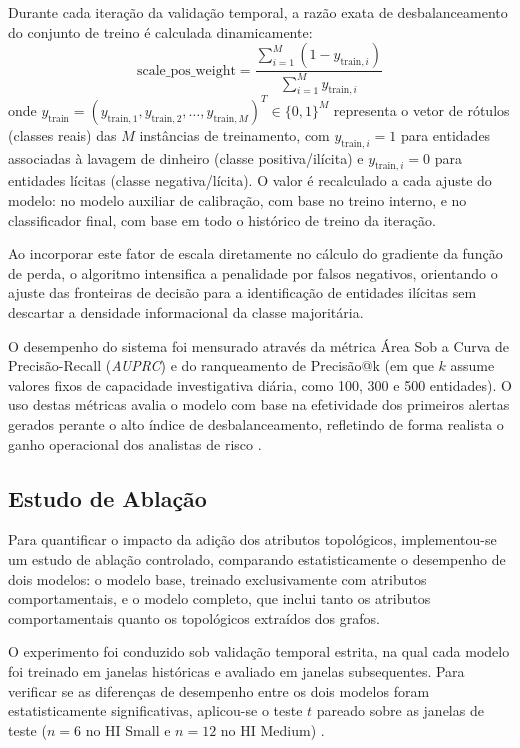 \documentclass[titlepage,a4paper,oneside,onecolumn,12pt]{report}
\begin{document}
Durante cada iteração da validação temporal, a razão exata de desbalanceamento do conjunto de treino é calculada dinamicamente:
\begin{equation}
    \text{scale\_pos\_weight} = \frac{\sum_{i=1}^{M} (1 - y_{\text{train}, i})}{\sum_{i=1}^{M} y_{\text{train}, i}}
\end{equation}
onde $y_{\text{train}} = (y_{\text{train}, 1}, y_{\text{train}, 2}, \dots, y_{\text{train}, M})^T \in \{0, 1\}^M$ representa o vetor de rótulos (classes reais) das $M$ instâncias de treinamento, com $y_{\text{train}, i} = 1$ para entidades associadas à lavagem de dinheiro (classe positiva/ilícita) e $y_{\text{train}, i} = 0$ para entidades lícitas (classe negativa/lícita). O valor é recalculado a cada ajuste do modelo: no modelo auxiliar de calibração, com base no treino interno, e no classificador final, com base em todo o histórico de treino da iteração.

Ao incorporar este fator de escala diretamente no cálculo do gradiente da função de perda, o algoritmo intensifica a penalidade por falsos negativos, orientando o ajuste das fronteiras de decisão para a identificação de entidades ilícitas sem descartar a densidade informacional da classe majoritária.

O desempenho do sistema foi mensurado através da métrica Área Sob a Curva de Precisão-Recall (\textit{AUPRC}) e do ranqueamento de Precisão@k (em que $k$ assume valores fixos de capacidade investigativa diária, como 100, 300 e 500 entidades). O uso destas métricas avalia o modelo com base na efetividade dos primeiros alertas gerados perante o alto índice de desbalanceamento, refletindo de forma realista o ganho operacional dos analistas de risco \cite{karim2024scalable}.

\subsection{Estudo de Ablação}

Para quantificar o impacto da adição dos atributos topológicos, implementou-se um estudo de ablação controlado, comparando estatisticamente o desempenho de dois modelos: o modelo base, treinado exclusivamente com atributos comportamentais, e o modelo completo, que inclui tanto os atributos comportamentais quanto os topológicos extraídos dos grafos.

O experimento foi conduzido sob validação temporal estrita, na qual cada modelo foi treinado em janelas históricas e avaliado em janelas subsequentes. Para verificar se as diferenças de desempenho entre os dois modelos foram estatisticamente significativas, aplicou-se o teste $t$ pareado sobre as janelas de teste ($n = 6$ no HI Small e $n = 12$ no HI Medium) \cite{dietterich1998approximate, japkowicz2011evaluating}.
\end{document}
